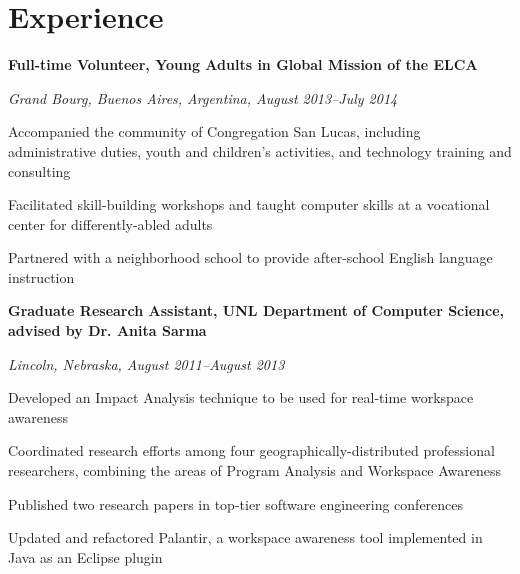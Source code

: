 \documentclass[10pt,letterpaper]{article}
\renewenvironment{itemize}{
  \begin{list}{}{
    \setlength{\leftmargin}{1.5em}
    \setlength{\itemsep}{0.25em}
    \setlength{\parskip}{0pt}
    \setlength{\parsep}{0.25em}
  }
}{
  \end{list}
}
\begin{document}





\section*{Experience}

\begin{itemize}
\item \textbf{Full-time Volunteer, Young Adults in Global Mission of the ELCA}
\item \emph{Grand Bourg, Buenos Aires, Argentina, August 2013--July 2014}
	\begin{itemize}
    \item Accompanied the community of Congregation San Lucas, including
    administrative duties, youth and children's activities, and technology
    training and consulting
    \item Facilitated skill-building workshops and taught computer skills at
    a vocational center for differently-abled adults
    \item Partnered with a neighborhood school to provide after-school
    English language instruction
	\end{itemize}
\end{itemize}

\begin{itemize}
\item \textbf{Graduate Research Assistant, UNL Department of Computer Science, advised by Dr. Anita Sarma}
\item \emph{Lincoln, Nebraska, August 2011--August 2013}
	\begin{itemize}
	\item Developed an Impact Analysis technique to be used for real-time workspace awareness
    \item Coordinated research efforts among four geographically-distributed
    professional researchers, combining the areas of Program Analysis and Workspace Awareness
    \item Published two research papers in top-tier software engineering conferences
	\item Updated and refactored Palantir, a workspace awareness tool implemented in Java as an Eclipse plugin
	\end{itemize}
\end{itemize}
\end{document}
